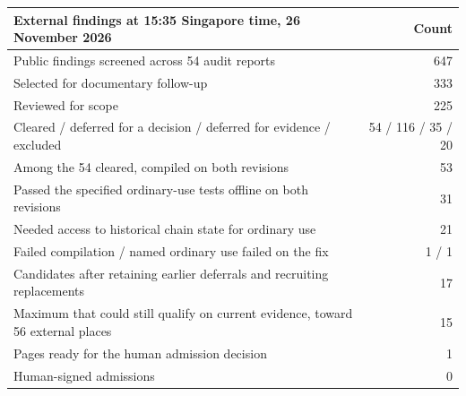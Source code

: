 \begin{tabularx}{\linewidth}{@{}Xr@{}}
\toprule
External findings at 15:35 Singapore time, 26 November 2026 & Count \\
\midrule
Public findings screened across 54 audit reports & 647 \\
Selected for documentary follow-up & 333 \\
Reviewed for scope & 225 \\
\quad Cleared / deferred for a decision / deferred for evidence / excluded & 54 / 116 / 35 / 20 \\
\addlinespace
Among the 54 cleared, compiled on both revisions & 53 \\
Passed the specified ordinary-use tests offline on both revisions & 31 \\
Needed access to historical chain state for ordinary use & 21 \\
Failed compilation / named ordinary use failed on the fix & 1 / 1 \\
\addlinespace
Candidates after retaining earlier deferrals and recruiting replacements & 17 \\
\quad Maximum that could still qualify on current evidence, toward 56 external places & 15 \\
Pages ready for the human admission decision & 1 \\
Human-signed admissions & 0 \\
\bottomrule
\end{tabularx}
